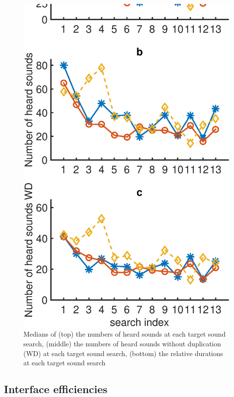 \documentclass{aes2e}
\begin{document}
\begin{figure}[t]
\begin{center}
\includegraphics[scale=0.4]{gfx/analyse2.eps} 
\end{center}
\caption{\label{fig2} Medians of (top) the numbers of heard sounds at each target sound search, (middle) the numbers of heard sounds without duplication (WD) at each target sound search, (bottom) the relative durations at each target sound search }
\end{figure}


\subsection{Interface efficiencies}
\end{document}
